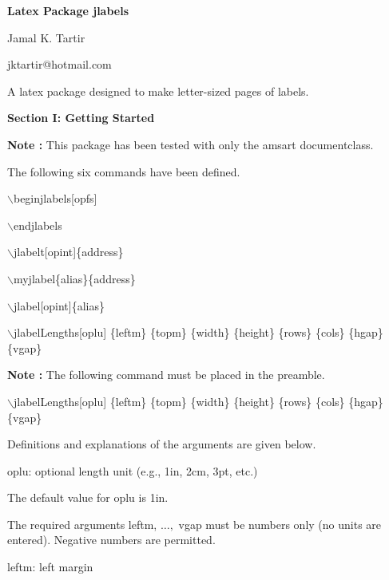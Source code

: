 \documentclass[12pt]{amsart}
\newcounter{Object}
\newcounter{SubObject}
\def\note{\addtocounter{Object}{1}%
         {\bf Note \theObject:}
         \setcounter{SubObject}{0}}
\begin{document}
\begin{center}

{\bf Latex Package jlabels}

Jamal K. Tartir

jktartir@hotmail.com

\end{center}

\vspace{15pt}

\begin{center}

A latex package designed to make letter-sized pages of labels.

\end{center}

\vspace{15pt}

\begin{center}

{\bf Section I: Getting Started}

\end{center}

\note
This package has been tested with only the amsart documentclass.

The following six commands have been defined.

\(\backslash\)beginjlabels[opfs]

\(\backslash\)endjlabels

\(\backslash\)jlabelt[opint]\{address\}

\(\backslash\)myjlabel\{alias\}\{address\}

\(\backslash\)jlabel[opint]\{alias\}

\(\backslash\)jlabelLengths[oplu]%
\{leftm\}%
\{topm\}%
\{width\}%
\{height\}%
\{rows\}%
\{cols\}%
\{hgap\}%
\{vgap\}

\note
The following command
must be placed in the preamble.

\(\backslash\)jlabelLengths[oplu]%
\{leftm\}%
\{topm\}%
\{width\}%
\{height\}%
\{rows\}%
\{cols\}%
\{hgap\}%
\{vgap\}

Definitions and explanations of the arguments are given below.

oplu: optional length unit (e.g., 1in, 2cm, 3pt, etc.)

The default value for oplu is 1in.

The required arguments leftm, \(\ldots,\) vgap
must be numbers only
(no units are entered).
Negative numbers are permitted.

leftm: left margin
\end{document}
